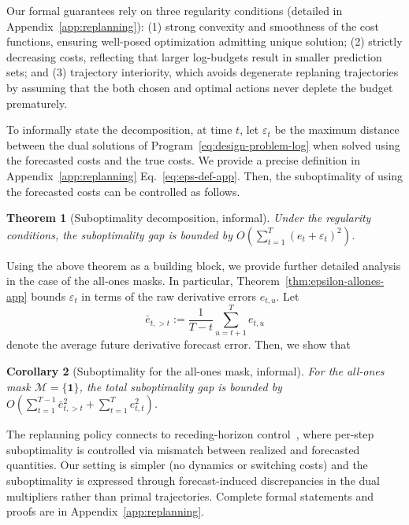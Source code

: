 \documentclass{uai2026} %
\newtheorem{theorem}{Theorem}[section]
\newtheorem{corollary}[theorem]{Corollary}
\newcommand{\1}{\mathbf{1}}
\renewcommand{\epsilon}{\varepsilon}
\newcommand{\mcal}{\mathcal{M}}
\begin{document}
Our formal guarantees rely on three regularity conditions (detailed in Appendix~\ref{app:replanning}): (1) strong convexity and smoothness of the cost functions, ensuring well-posed optimization admitting unique solution; (2) strictly decreasing costs, reflecting that larger log-budgets result in smaller prediction sets; and (3) trajectory interiority, which avoids degenerate replaning trajectories by assuming that the both chosen and optimal actions never deplete the budget prematurely.

To informally state the decomposition, at time $t$, let $\epsilon_t$ be the maximum distance between the dual solutions of Program~\ref{eq:design-problem-log} when solved using the forecasted costs and the true costs. We provide a precise definition in Appendix~\ref{app:replanning} Eq.~\ref{eq:eps-def-app}. Then, the suboptimality of using the forecasted costs can be controlled as follows.

\begin{theorem}[Suboptimality decomposition, informal]
  \label{thm:regret-decomp-informal}
  Under the regularity conditions, the suboptimality gap is bounded by $O\!\left( \sum_{t=1}^T (e_t + \epsilon_t)^2 \right)$.
\end{theorem}

Using the above theorem as a building block, we provide further detailed analysis in the case of the all-ones masks. In particular, Theorem~\ref{thm:epsilon-allones-app} bounds $\epsilon_t$ in terms of the raw derivative errors $e_{t,u}$. Let $$\bar{e}_{t,>t} := \frac{1}{T-t} \sum_{u=t+1}^{T} e_{t,u}$$ denote the average future derivative forecast error. Then, we show that
\begin{corollary}[Suboptimality for the all-ones mask, informal]
  \label{cor:regret-allones-informal}
  For the all-ones mask $\mcal = \{\1\}$, the total suboptimality gap is bounded by
  $O\!\left( \sum_{t=1}^{T-1} \bar{e}_{t,>t}^2 + \sum_{t=1}^{T} e_{t,t}^2 \right)$.
\end{corollary}

The replanning policy connects to receding-horizon control~\citep{lin2021perturbation,lin2022bounded,li2020leveraging,vera2021online}, where per-step suboptimality is controlled via mismatch between realized and forecasted quantities.
Our setting is simpler (no dynamics or switching costs) and the suboptimality is expressed through forecast-induced discrepancies in the dual multipliers rather than primal trajectories.
Complete formal statements and proofs are in Appendix~\ref{app:replanning}.
\end{document}

